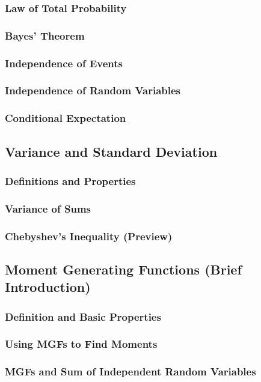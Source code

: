 \subsubsection{Law of Total Probability}
\subsubsection{Bayes' Theorem}
\subsubsection{Independence of Events}
\subsubsection{Independence of Random Variables}
\subsubsection{Conditional Expectation}

\subsection{Variance and Standard Deviation}
\subsubsection{Definitions and Properties}
\subsubsection{Variance of Sums}
\subsubsection{Chebyshev's Inequality (Preview)}

\subsection{Moment Generating Functions (Brief Introduction)}
\subsubsection{Definition and Basic Properties}
\subsubsection{Using MGFs to Find Moments}
\subsubsection{MGFs and Sum of Independent Random Variables}

